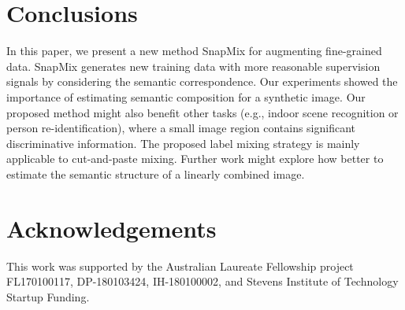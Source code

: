 \documentclass[letterpaper]{article} \usepackage{aaai21}  \usepackage{times}  \usepackage{helvet} \usepackage{courier}  \usepackage[hyphens]{url}  \usepackage{graphicx} \urlstyle{rm} \def\UrlFont{\rm}  \usepackage{natbib}  \usepackage{caption} \frenchspacing  \setlength{\pdfpagewidth}{8.5in}  \setlength{\pdfpageheight}{11in}
\begin{document}
\iffalse
\noindent\textbf{Regularization capability.}
We investigated the regulation ability of augmentation methods by comparing their testing accuracy curves. As shown in Fig.~\ref{fig:curve}, all the comparing approaches exacerbate the sudden performance improvement after the first learning rate decay step (at  epoch). After that, the accuracy of existing methods tends to fluctuate around their first best values, while our method's accuracy continues to rise until the final stage. This result demonstrates our proposed method exhibits superior regularization ability than other approaches in improving model generalization.
\fi







\section{Conclusions}
In this paper, we present a new method SnapMix for augmenting fine-grained data. SnapMix generates new training data with more reasonable supervision signals by considering the semantic correspondence. Our experiments showed the importance of estimating semantic composition for a synthetic image.  Our proposed method might also benefit other tasks (e.g.,  indoor scene recognition or person re-identification), where a small image region contains significant discriminative information. The proposed label mixing strategy is mainly applicable to cut-and-paste mixing. Further work might explore how better to estimate the semantic structure of a linearly combined image.
\section{Acknowledgements}
This work was supported by the Australian Laureate Fellowship project FL170100117, DP-180103424, IH-180100002,
and Stevens Institute of Technology Startup Funding.
 

\end{document}
